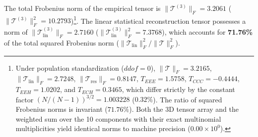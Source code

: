 \documentclass[11pt,a4paper]{article}
\begin{document}
\begin{table}[!htbp]
\centering
\small
\caption{Independent components of the third-order moment tensor $\mathcal{T}^{(3)}$ ($N=466$, 1980--2018; standardized with $ddof=1$). All values and multiplicities exactly reproduce the total Frobenius norm and projection identities.}
\label{tab:tensor}
\end{table}

The total Frobenius norm of the empirical tensor is $\|\mathcal{T}^{(3)}\|_F = 3.2061$ ($\|\mathcal{T}^{(3)}\|_F^2 = 10.2793$)\footnote{Under population standardization ($ddof=0$), $\|\mathcal{T}\|_F = 3.2165$, $\|\mathcal{T}_{\text{lin}}\|_F = 2.7248$, $\|\mathcal{T}_{\text{res}}\|_F = 0.8147$, $T_{EEE} = 1.5758$, $T_{CCC} = -0.4444$, $T_{EEH} = 1.0202$, and $T_{ECH} = 0.3465$, which differ strictly by the constant factor $(N/(N-1))^{3/2} = 1.003228$ ($0.32\%$). The ratio of squared Frobenius norms is invariant ($71.76\%$). Both the 3D tensor array and the weighted sum over the 10 components with their exact multinomial multiplicities yield identical norms to machine precision ($0.00 \times 10^0$).}. The linear statistical reconstruction tensor possesses a norm of $\|\mathcal{T}_{\text{lin}}^{(3)}\|_F = 2.7160$ ($\|\mathcal{T}_{\text{lin}}^{(3)}\|_F^2 = 7.3768$), which accounts for \textbf{71.76\%} of the total squared Frobenius norm ($\|\mathcal{T}_{\text{lin}}\|_F^2 / \|\mathcal{T}\|_F^2$).
\end{document}
